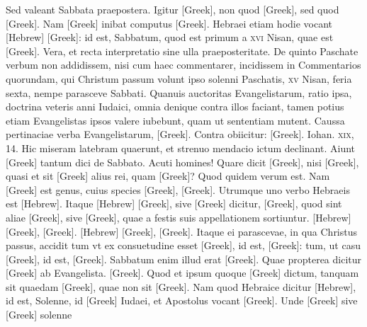 Sed valeant Sabbata praepostera.
Igitur \textgreek{[Greek]}, non quod \textgreek{[Greek]}, sed
quod \textgreek{[Greek]}.
Nam \textgreek{[Greek]} inibat
computus \textgreek{[Greek]}.
Hebraei etiam hodie vocant \texthebrew{[Hebrew]}
\textgreek{[Greek]}: id est, Sabbatum, quod est primum a
\textsc{xvi} Nisan, quae est \textgreek{[Greek]}.
Vera, et recta interpretatio sine ulla praeposteritate.
De quinto Paschate verbum non addidissem,
nisi cum haec commentarer, incidissem in Commentarios quorundam,
qui Christum passum volunt ipso solenni Paschatis, \textsc{xv}
Nisan, feria sexta, nempe parasceve Sabbati.
Quanuis auctoritas
Evangelistarum, ratio ipsa, doctrina veteris anni Iudaici, omnia
denique contra illos faciant, tamen potius etiam Evangelistas ipsos
valere iubebunt, quam ut sententiam mutent.
Caussa pertinaciae
verba Evangelistarum, \textgreek{[Greek]}.
Contra obiicitur:
\textgreek{[Greek]}.
Iohan. \textsc{xix}, 14.
Hic miseram latebram quaerunt,
et strenuo mendacio ictum declinant.
Aiunt \textgreek{[Greek]} tantum
dici de Sabbato.
Acuti homines!
Quare dicit \textgreek{[Greek]},
nisi \textgreek{[Greek]}, quasi et sit \textgreek{[Greek]}
 alius rei, quam \textgreek{[Greek]}?
Quod quidem verum est.
Nam \textgreek{[Greek]} est genus, cuius species
\textgreek{[Greek]}, \textgreek{[Greek]}.
Utrumque uno verbo Hebraeis est
\texthebrew{[Hebrew]}.
Itaque \texthebrew{[Hebrew]} \textgreek{[Greek]},
 sive \textgreek{[Greek]} dicitur,
\textgreek{[Greek]}, quod sint aliae \textgreek{[Greek]},
 sive \textgreek{[Greek]}, quae a festis
suis appellationem sortiuntur.
\texthebrew{[Hebrew]} \textgreek{[Greek]}, \textgreek{[Greek]}.
\texthebrew{[Hebrew]} \textgreek{[Greek]}, \textgreek{[Greek]}.
Itaque ei parascevae, in qua Christus passus, accidit tum
vt ex consuetudine esset \textgreek{[Greek]}, id est, \textgreek{[Greek]}:
tum, ut casu \textgreek{[Greek]}, id est, \textgreek{[Greek]}.
Sabbatum enim
illud erat \textgreek{[Greek]}.
Quae propterea dicitur \textgreek{[Greek]}
ab Evangelista.
\textgreek{[Greek]}.
Quod
et ipsum quoque \textgreek{[Greek]} dictum, tanquam sit quaedam
 \textgreek{[Greek]},
quae non sit \textgreek{[Greek]}.
Nam quod Hebraice dicitur \texthebrew{[Hebrew]},
id est, Solenne, id \textgreek{[Greek]} Iudaei, et Apostolus vocant
 \textgreek{[Greek]}.
Unde \textgreek{[Greek]} sive \textgreek{[Greek]} solenne
